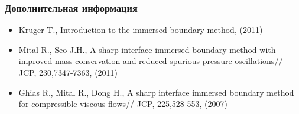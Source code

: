 \documentclass[14pt]{beamer}
\begin{document}
\begin{frame}
\frametitle{Дополнительная информация}
    \begin{itemize}
        \item Kruger T., Introduction to the immersed boundary method, (2011)
        \item Mital R., Seo J.H., A sharp-interface immersed boundary method with improved mass conservation and reduced spurious pressure oscillations// JCP, 230,7347-7363, (2011)
        \item Ghias R., Mital R., Dong H., A sharp interface immersed boundary method for compressible viscous flows// JCP, 225,528-553, (2007)
    \end{itemize}
\end{frame}
\end{document}

